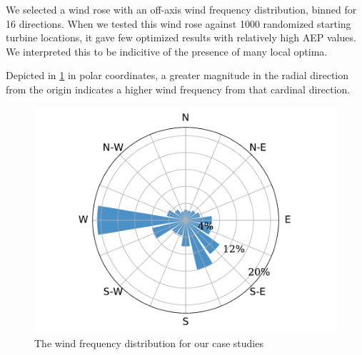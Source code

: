 

	We selected a wind rose with an off-axis wind frequency distribution, binned for 16 directions.
	When we tested this wind rose against 1000 randomized starting turbine locations, it gave few optimized results with relatively high AEP values.
	We interpreted this to be indicitive of the presence of many local optima.

	Depicted in \cref{fig:freqdist} in polar coordinates, a greater magnitude in the radial direction from the origin indicates a higher wind frequency from that cardinal direction.
	
	\begin{figure}[H]
		\centering \includegraphics[width=.5\textwidth]{./figures/windrose.pdf}
		\caption{The wind frequency distribution for our case studies}
		\label{fig:freqdist}
	\end{figure}

